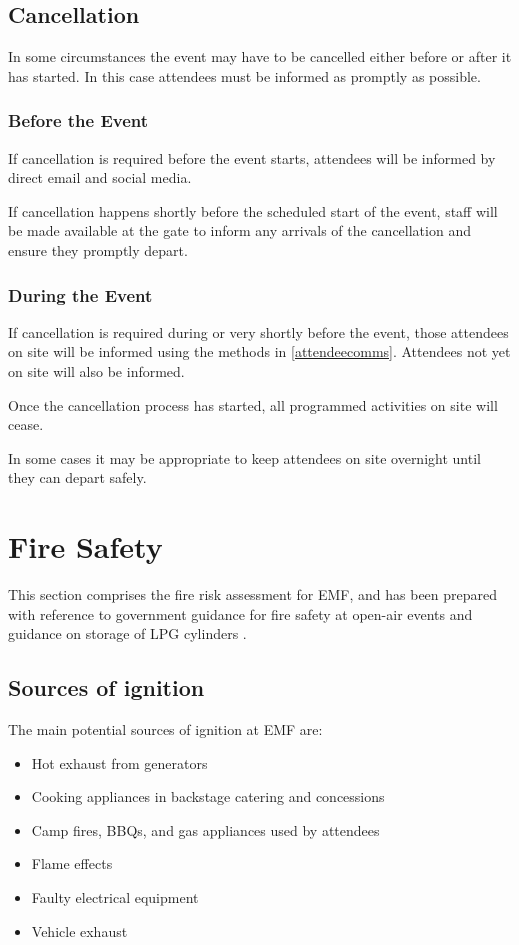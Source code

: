\subsection{Cancellation}\label{cancellation}
In some circumstances the event may have to be cancelled either before or after it has
started. In this case attendees must be informed as promptly as possible.

\subsubsection{Before the Event}
If cancellation is required before the event starts, attendees will be informed by
direct email and social media.

If cancellation happens shortly before the scheduled start of the event, staff will
be made available at the gate to inform any arrivals of the cancellation and ensure
they promptly depart.

\subsubsection{During the Event}
If cancellation is required during or very shortly before the event, those attendees
on site will be informed using the methods in \cref{attendeecomms}. Attendees
not yet on site will also be informed.

Once the cancellation process has started, all programmed activities on site will
cease.

In some cases it may be appropriate to keep attendees on site overnight
until they can depart safely.

\newpage

\section{Fire Safety}\label{fire}

This section comprises the fire risk assessment for EMF, and has been prepared with reference
to government guidance for fire safety at open-air events \cite{firesafety} and guidance on storage
of LPG cylinders \cite{lpgstorage}.

\subsection{Sources of ignition}

The main potential sources of ignition at EMF are:

\begin{itemize}
    \tightlist
    \item Hot exhaust from generators
    \item Cooking appliances in backstage catering and concessions
    \item Camp fires, BBQs, and gas appliances used by attendees
    \item Flame effects
    \item Faulty electrical equipment
    \item Vehicle exhaust
\end{itemize}

